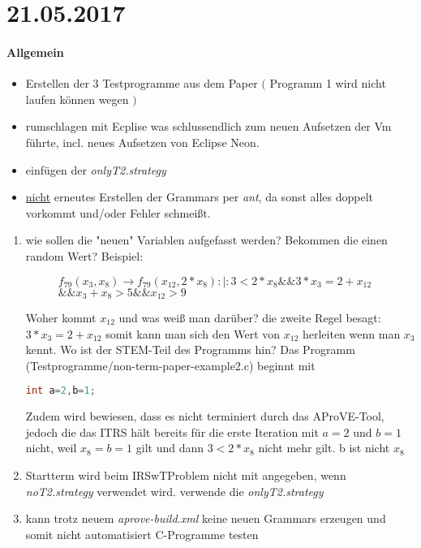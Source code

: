 \section*{21.05.2017}

\paragraph{Allgemein}
\begin{itemize}
	\item Erstellen der 3 Testprogramme aus dem Paper $($ Programm 1 wird nicht laufen können wegen  $)$
	\item rumschlagen mit Ecplise was schlussendlich zum neuen Aufsetzen der Vm führte, incl. neues Aufsetzen von Eclipse Neon.
	\item einfügen der \emph{onlyT2.strategy}
	\item \underline{nicht} erneutes Erstellen der Grammars per \emph{ant}, da sonst alles doppelt vorkommt und/oder Fehler schmeißt.
\end{itemize}

\begin{enumerate}
	\item wie sollen die "neuen" Variablen aufgefasst werden? Bekommen die einen random Wert? Beispiel: \newline 
		\begin{figure}[h]
			\centering
			$f_{79}(x_{3}, x_{8}) \rightarrow f_{79}(x_{12}, 2 * x_{8}) $\quad$ :|: 3 < 2 * x_{8}$\quad$\&\&$\quad$3 * x_{3} = 2 + x_{12}$\quad$\&\&$\quad$x_3 + x_8 > 5$\quad$\&\&$\quad$x_{12} > 9$
		\end{figure}
		\newline Woher kommt $x_{12}$ und was weiß man darüber? \answer die zweite Regel besagt: $3 * x_{3} = 2 + x_{12}$ somit kann  man sich den Wert von $x_{12}$ herleiten wenn man $x_3$ kennt. \newline
		Wo ist der STEM-Teil des Programms hin? Das Programm (Testprogramme/non-term-paper-example2.c) beginnt mit 
		\begin{lstlisting}[language=c, commentstyle=\fontsize{12}{14.4}\selectfont, basicstyle=\ttfamily\fontsize{10}{12}\selectfont]
			int a=2,b=1;
		\end{lstlisting}
		Zudem wird bewiesen, dass es nicht terminiert durch das AProVE-Tool, jedoch die das ITRS hält bereits für die erste Iteration mit $a=2$ und $b=1$ nicht, weil $ x_8=b=1 $ gilt und dann $ 3<2*x_8 $ nicht mehr gilt. \answer b ist nicht $x_8$
	\item Startterm wird beim IRSwTProblem nicht mit angegeben, wenn \emph{noT2.strategy} verwendet wird. \answer verwende die 		\emph{onlyT2.strategy}
	\item kann trotz neuem \emph{aprove-build.xml} keine neuen Grammars erzeugen und somit nicht automatisiert C-Programme testen
\end{enumerate}
